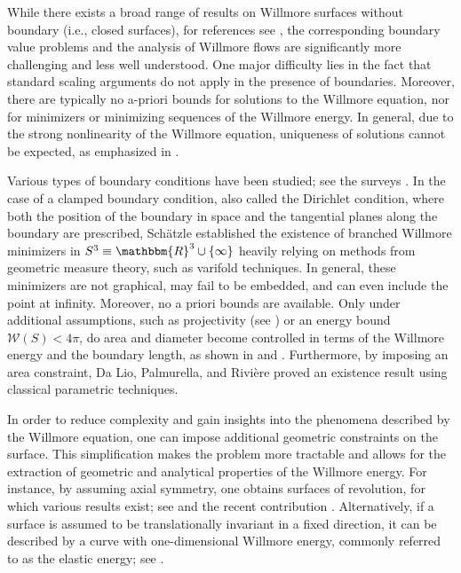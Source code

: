 \documentclass[12pt,a4paper,twoside]{article}
\newcommand{\R}{\mathbbm {R}}
\newcommand{\W}{\mathcal {W}}
\begin{document}
While there exists a broad range of results on Willmore surfaces without boundary (i.e., closed surfaces), for references see \cite{willmore1996riemannian, li1982new, marques2014willmore, simon1993existence, bauer2003existence, simonett2001willmore, kuwert2004removability, chill2009willmore, blatt2009singular, koch2012geometric}, the corresponding boundary value problems and the analysis of Willmore flows are significantly more challenging and less well understood. One major difficulty lies in the fact that standard scaling arguments do not apply in the presence of boundaries. Moreover, there are typically no a-priori bounds for solutions to the Willmore equation, nor for minimizers or minimizing sequences of the Willmore energy.  In general, due to the strong nonlinearity of the Willmore equation, uniqueness of solutions cannot be expected, as emphasized in  \cite{eichmann2016nonuniqueness}. 

Various types of boundary conditions have been studied; see the surveys  \cite{nitsche1993boundary, grunau2018boundary}.  In the case of a clamped boundary condition, also called the Dirichlet condition, where both the position of the boundary in space and the tangential planes along the boundary are prescribed, Schätzle \cite{schatzle2010willmore} established the existence of branched Willmore minimizers in $S^3\equiv \R^3\cup \{\infty\}$ heavily relying on methods from geometric measure theory, such as varifold techniques. In general, these minimizers are not graphical, may fail to be embedded, and can even include the point at infinity. Moreover, no a priori bounds are available. Only under additional assumptions, such as projectivity (see \cite{deckelnick2017minimising}) or an energy bound $\W(S)<4\pi$, do area and diameter become controlled in terms of the Willmore energy and the boundary length, as shown in \cite{pozzetta2018plateau} and \cite[Subsection 4.1]{gulyak2024boundary}. Furthermore, by imposing an area constraint, Da Lio, Palmurella, and Rivière \cite{da2020resolution} proved an existence result using classical parametric techniques.

In order to reduce complexity and gain insights into the phenomena described by the Willmore equation, one can impose additional geometric constraints on the surface. This simplification makes the problem more tractable and allows for the extraction of geometric and analytical properties of the Willmore energy. For instance, by assuming axial symmetry, one obtains surfaces of revolution, for which various results exist; see \cite{dall2008classical,  dall2013unstable, deckelnick2007boundary, grunau2023willmore} and the recent contribution \cite{schlierf2024convergence}. Alternatively, if a surface is assumed to be translationally invariant in a fixed direction, it can be described by a curve with one-dimensional Willmore energy, commonly referred to as the elastic energy; see \cite{deckelnick2007boundary,deckelnick2009stability}.
\end{document}
